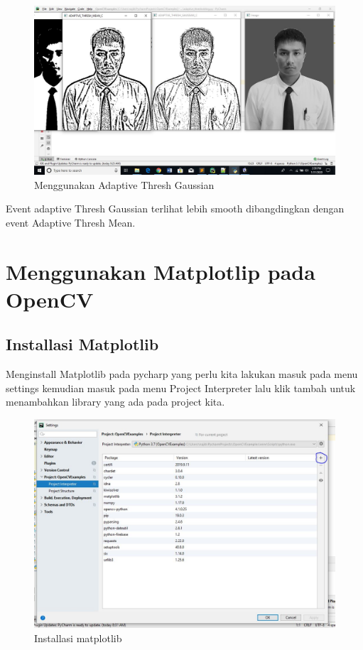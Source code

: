 \newpage
\begin{figure}[ht]
\centering
\includegraphics[scale=0.35]{figures/2,45.jpg}
\caption{Menggunakan Adaptive Thresh Gaussian}
\label{contoh}
\end{figure}
Event adaptive Thresh Gaussian terlihat lebih smooth dibangdingkan dengan event Adaptive Thresh Mean.




\newpage
\section{Menggunakan Matplotlip pada OpenCV}
\subsection{Installasi Matplotlib}
Menginstall Matplotlib pada pycharp yang perlu kita lakukan masuk pada menu settings kemudian masuk pada menu Project Interpreter lalu klik tambah untuk menambahkan library yang ada pada project kita.
\begin{figure}[ht]
\centering
\includegraphics[scale=0.45]{figures/2,46.jpg}
\caption{Installasi matplotlib}
\label{contoh}
\end{figure}

